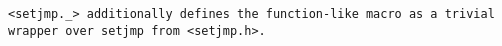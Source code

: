 \tt{<setjmp._>} additionally defines the function-like macro
 as a trivial wrapper over \tt{setjmp} from \tt{<setjmp.h>}.
